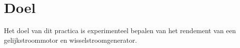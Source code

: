 \section{Doel}
Het doel van dit practica is experimenteel bepalen van het rendement
van een gelijkstroommotor en wisselstroomgenerator.

